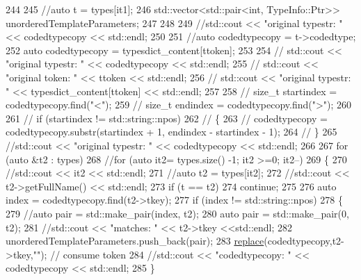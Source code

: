 \begin{DoxyCode}
244 
245         \textcolor{comment}{//auto t = types[it1];}
246         std::vector<std::pair<int, TypeInfo::Ptr>> unorderedTemplateParameters;
247 
248         
249         \textcolor{comment}{//std::cout << "original typestr: " << codedtypecopy << std::endl;}
250 
251         \textcolor{comment}{//auto codedtypecopy = t->codedtype;}
252         \textcolor{keyword}{auto} codedtypecopy = typesdict\_content[ttoken];
253 
254         \textcolor{comment}{// std::cout << "original typestr: " << codedtypecopy << std::endl;}
255         \textcolor{comment}{// std::cout << "original token: " << ttoken << std::endl;}
256         \textcolor{comment}{// std::cout << "original typestr: " << typesdict\_content[ttoken] << std::endl;}
257 
258         \textcolor{comment}{// size\_t startindex = codedtypecopy.find("<");}
259         \textcolor{comment}{// size\_t endindex = codedtypecopy.find(">");}
260 
261         \textcolor{comment}{// if (startindex != std::string::npos)}
262         \textcolor{comment}{// \{}
263         \textcolor{comment}{//     codedtypecopy = codedtypecopy.substr(startindex + 1, endindex - startindex - 1);}
264         \textcolor{comment}{// \}}
265         \textcolor{comment}{//std::cout << "original typestr: " << codedtypecopy << std::endl;}
266 
267         \textcolor{keywordflow}{for} (\textcolor{keyword}{auto} &t2 : types)
268         \textcolor{comment}{//for (auto it2= types.size() -1; it2 >=0; it2--)}
269         \{
270             \textcolor{comment}{//std::cout << it2 << std::endl;}
271             \textcolor{comment}{//auto t2 = types[it2];}
272             \textcolor{comment}{//std::cout << t2->getFullName() << std::endl;}
273             \textcolor{keywordflow}{if} (t == t2)
274                 \textcolor{keywordflow}{continue};
275 
276             \textcolor{keyword}{auto} index = codedtypecopy.find(t2->tkey);
277             \textcolor{keywordflow}{if} (index != std::string::npos)
278             \{
279                 \textcolor{comment}{//auto pair = std::make\_pair(index, t2);}
280                 \textcolor{keyword}{auto} pair = std::make\_pair(0, t2);
281                 \textcolor{comment}{//std::cout << "matches: " << t2->tkey <<std::endl;}
282                 unorderedTemplateParameters.push\_back(pair);
283                 \hyperlink{namespacesmacc_1_1introspection_a48571b9bf3b115d2a83cc0147c96d0bd}{replace}(codedtypecopy,t2->tkey,\textcolor{stringliteral}{""}); \textcolor{comment}{// consume token}
284                 \textcolor{comment}{//std::cout << "codedtypecopy: " << codedtypecopy << std::endl;}
285             \}

\end{DoxyCode}
